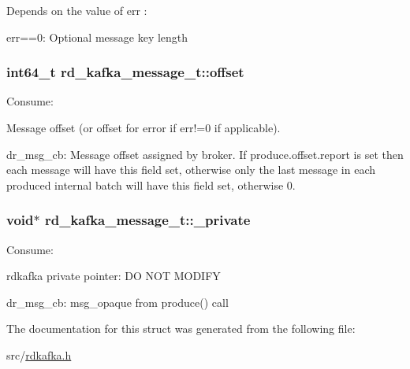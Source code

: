 \label{structrd__kafka__message__t_a170276e797dab0eb732db4eecd329a95}
Depends on the value of {\ttfamily err} :
\begin{DoxyItemize}
\item {\ttfamily err==0}: Optional message key length 
\end{DoxyItemize}\hypertarget{structrd__kafka__message__t_a979bd27da570c93768e474527ddb136e}{
\subsubsection[{offset}]{\setlength{\rightskip}{0pt plus 5cm}int64\_\-t {\bf rd\_\-kafka\_\-message\_\-t::offset}}}
\label{structrd__kafka__message__t_a979bd27da570c93768e474527ddb136e}
Consume:
\begin{DoxyItemize}
\item Message offset (or offset for error if {\ttfamily err!=0} if applicable).
\item dr\_\-msg\_\-cb: Message offset assigned by broker. If {\ttfamily produce.offset.report} is set then each message will have this field set, otherwise only the last message in each produced internal batch will have this field set, otherwise 0. 
\end{DoxyItemize}\hypertarget{structrd__kafka__message__t_a8eb860a90c978b15892eef54953d5289}{
\subsubsection[{\_\-private}]{\setlength{\rightskip}{0pt plus 5cm}void$\ast$ {\bf rd\_\-kafka\_\-message\_\-t::\_\-private}}}
\label{structrd__kafka__message__t_a8eb860a90c978b15892eef54953d5289}
Consume:
\begin{DoxyItemize}
\item rdkafka private pointer: DO NOT MODIFY
\item dr\_\-msg\_\-cb: msg\_\-opaque from produce() call 
\end{DoxyItemize}

The documentation for this struct was generated from the following file:\begin{DoxyCompactItemize}
\item 
src/\hyperlink{rdkafka_8h}{rdkafka.h}\end{DoxyCompactItemize}
